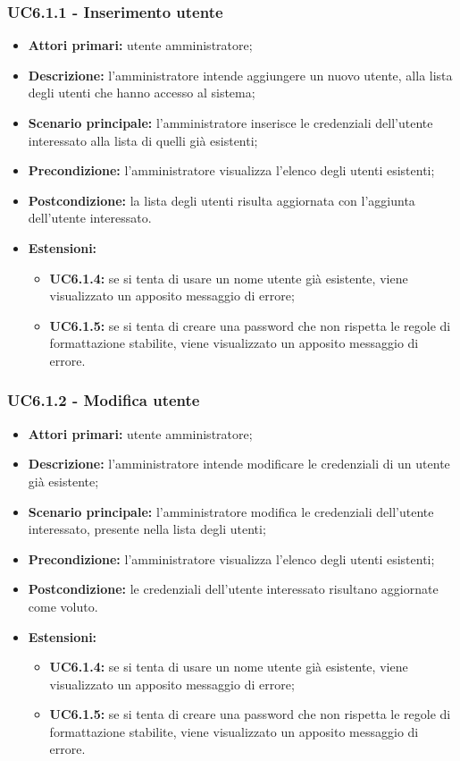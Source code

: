 \subsubsection{UC6.1.1 - Inserimento utente}
\begin{itemize}
	\item \textbf{Attori primari:} utente amministratore;
	\item \textbf{Descrizione:} l'amministratore intende aggiungere un nuovo utente, alla lista degli utenti che hanno accesso al sistema;
	\item \textbf{Scenario principale:} l'amministratore inserisce le credenziali dell'utente interessato alla lista di quelli già esistenti;
	\item \textbf{Precondizione:} l'amministratore visualizza l'elenco degli utenti esistenti;
	\item \textbf{Postcondizione:} la lista degli utenti risulta aggiornata con l'aggiunta dell'utente interessato.
	\item \textbf{Estensioni:}
		\begin{itemize}
			\item \textbf{UC6.1.4:} se si tenta di usare un nome utente già esistente, viene visualizzato un apposito messaggio di errore;
			\item \textbf{UC6.1.5:} se si tenta di creare una password che non rispetta le regole di formattazione stabilite, viene visualizzato un apposito messaggio di errore.
		\end{itemize}
\end{itemize}

\subsubsection{UC6.1.2 - Modifica utente}
\begin{itemize}
	\item \textbf{Attori primari:} utente amministratore;
	\item \textbf{Descrizione:} l'amministratore intende modificare le credenziali di un utente già esistente;
	\item \textbf{Scenario principale:} l'amministratore modifica le credenziali dell'utente interessato, presente nella lista degli utenti;
	\item \textbf{Precondizione:} l'amministratore visualizza l'elenco degli utenti esistenti;
	\item \textbf{Postcondizione:} le credenziali dell'utente interessato risultano aggiornate come voluto.
	\item \textbf{Estensioni:}
	\begin{itemize}
		\item \textbf{UC6.1.4:} se si tenta di usare un nome utente già esistente, viene visualizzato un apposito messaggio di errore;
		\item \textbf{UC6.1.5:} se si tenta di creare una password che non rispetta le regole di formattazione stabilite, viene visualizzato un apposito messaggio di errore.
	\end{itemize}
\end{itemize}

